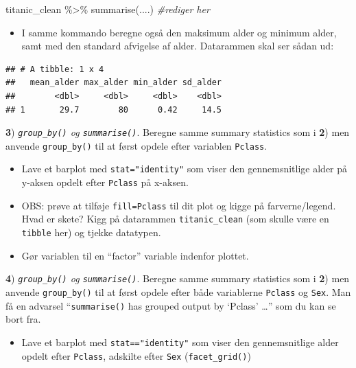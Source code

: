 \documentclass[
]{book}
\newenvironment{Shaded}{\begin{snugshade}}{\end{snugshade}}
\newcommand{\CommentTok}[1]{\textcolor[rgb]{0.56,0.35,0.01}{\textit{#1}}}
\newcommand{\FunctionTok}[1]{\textcolor[rgb]{0.00,0.00,0.00}{#1}}
\newcommand{\NormalTok}[1]{#1}
\newcommand{\SpecialCharTok}[1]{\textcolor[rgb]{0.00,0.00,0.00}{#1}}
\providecommand{\tightlist}{%
  \setlength{\itemsep}{0pt}\setlength{\parskip}{0pt}}
\begin{document}
\begin{Shaded}
\begin{Highlighting}[]
\NormalTok{titanic\_clean }\SpecialCharTok{\%\textgreater{}\%}
    \FunctionTok{summarise}\NormalTok{(....) }\CommentTok{\#rediger her}
\end{Highlighting}
\end{Shaded}

\begin{itemize}
\tightlist
\item
  I samme kommando beregne også den maksimum alder og minimum alder, samt med den standard afvigelse af alder. Datarammen skal ser sådan ud:
\end{itemize}

\begin{verbatim}
## # A tibble: 1 x 4
##   mean_alder max_alder min_alder sd_alder
##        <dbl>     <dbl>     <dbl>    <dbl>
## 1       29.7        80      0.42     14.5
\end{verbatim}

\textbf{3}) \emph{\texttt{group\_by()} og \texttt{summarise()}}. Beregne samme summary statistics som i \textbf{2}) men anvende \texttt{group\_by()} til at først opdele efter variablen \texttt{Pclass}.

\begin{itemize}
\tightlist
\item
  Lave et barplot med \texttt{stat="identity"} som viser den gennemsnitlige alder på y-aksen opdelt efter \texttt{Pclass} på x-aksen.
\item
  OBS: prøve at tilføje \texttt{fill=Pclass} til dit plot og kigge på farverne/legend. Hvad er skete? Kigg på datarammen \texttt{titanic\_clean} (som skulle være en \texttt{tibble} her) og tjekke datatypen.
\item
  Gør variablen til en ``factor'' variable indenfor plottet.
\end{itemize}

\textbf{4}) \emph{\texttt{group\_by()} og \texttt{summarise()}}. Beregne samme summary statistics som i \textbf{2}) men anvende \texttt{group\_by()} til at først opdele efter både variablerne \texttt{Pclass} og \texttt{Sex}. Man få en advarsel ``\texttt{summarise()} has grouped output by `Pclass' \ldots{}'' som du kan se bort fra.

\begin{itemize}
\tightlist
\item
  Lave et barplot med \texttt{stat=="identity"} som viser den gennemsnitlige alder opdelt efter \texttt{Pclass}, adskilte efter \texttt{Sex} (\texttt{facet\_grid()})
\end{itemize}
\end{document}

